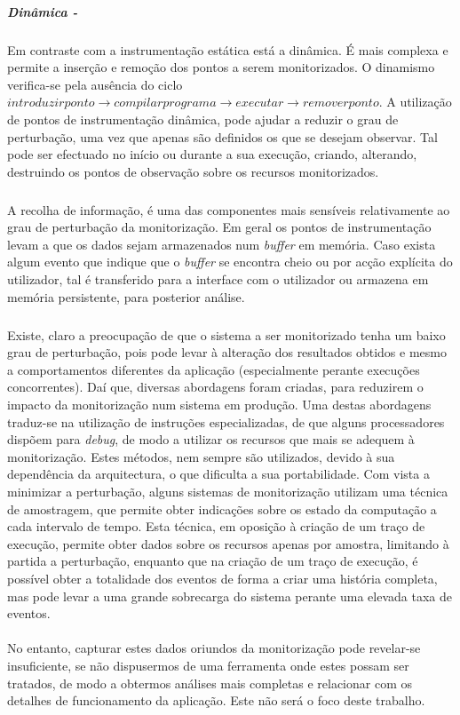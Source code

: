 \subparagraph*{Dinâmica - }

Em contraste com a instrumentação estática está a dinâmica.
É mais complexa e permite a inserção e remoção dos pontos a serem monitorizados.
O dinamismo verifica-se pela ausência do ciclo $introduzir ponto\rightarrow compilar programa\rightarrow executar\rightarrow remover ponto$.
A utilização de pontos de instrumentação dinâmica, pode ajudar a reduzir o grau de perturbação, uma vez que apenas são definidos os que se desejam observar.
Tal pode ser efectuado no início ou durante a sua execução, criando, alterando, destruindo os pontos de observação sobre os recursos monitorizados.


\subparagraph*{
}
A recolha de informação, é uma das componentes mais sensíveis relativamente ao grau de perturbação da monitorização.
Em geral os pontos de instrumentação levam a que os dados sejam armazenados num \textit{buffer} em memória.
Caso exista algum evento que indique que o \textit{buffer} se encontra cheio ou por acção explícita do utilizador, tal é transferido para a interface com o utilizador ou armazena em memória persistente, para posterior análise.

\subparagraph*{
}
Existe, claro a preocupação de que o sistema a ser monitorizado tenha um baixo grau de perturbação, pois pode levar à alteração dos resultados obtidos e mesmo a comportamentos diferentes da aplicação (especialmente perante execuções concorrentes).
Daí que, diversas abordagens foram criadas, para reduzirem o impacto da monitorização num sistema em produção.
Uma destas abordagens traduz-se na utilização de instruções especializadas, de que alguns processadores dispõem para \textit{debug}, de modo a utilizar os recursos que mais se adequem à monitorização.
Estes métodos, nem sempre são utilizados, devido à sua dependência da arquitectura, o que dificulta a sua portabilidade.
Com vista a minimizar a perturbação, alguns sistemas de monitorização utilizam uma técnica de amostragem, que permite obter indicações sobre os estado da computação a cada intervalo de tempo.
Esta técnica, em oposição à criação de um traço de execução, permite obter dados sobre os recursos apenas por amostra, limitando à partida a perturbação, enquanto que na criação de um traço de execução, é possível obter a totalidade dos eventos de forma a criar uma história completa, mas pode levar a uma grande sobrecarga do sistema perante uma elevada taxa de eventos.

\paragraph*{
}
No entanto, capturar estes dados oriundos da monitorização pode revelar-se insuficiente, se não dispusermos de uma ferramenta onde estes possam ser tratados, de modo a obtermos análises mais completas e relacionar com os detalhes de funcionamento da aplicação.
Este não será o foco deste trabalho.

